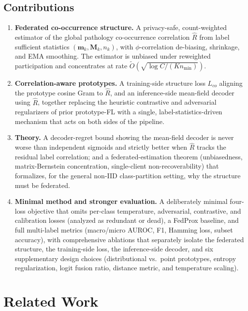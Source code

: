 \documentclass[11pt,a4paper]{article}
\theoremstyle{definition}
\newcommand{\Rhat}{\widehat{R}}
\begin{document}
\subsection{Contributions}

\begin{enumerate}[leftmargin=*,itemsep=2pt]
  \item \textbf{Federated co-occurrence structure.} A privacy-safe, count-weighted estimator of the global pathology co-occurrence correlation $\Rhat$ from label sufficient statistics $(\mathbf{m}_k,\mathbf{M}_k,n_k)$, with $\phi$-correlation de-biasing, shrinkage, and EMA smoothing. The estimator is unbiased under reweighted participation and concentrates at rate \allowbreak$\tilde O(\sqrt{\log C/(K n_{\min})})$.
  \item \textbf{Correlation-aware prototypes.} A training-side structure loss $L_{co}$ aligning the prototype cosine Gram to $\Rhat$, and an inference-side mean-field decoder using $\Rhat$, together replacing the heuristic contrastive and adversarial regularizers of prior prototype-FL with a single, label-statistics-driven mechanism that acts on both sides of the pipeline.
  \item \textbf{Theory.} A decoder-regret bound showing the mean-field decoder is never worse than independent sigmoids and strictly better when $\Rhat$ tracks the residual label correlation; and a federated-estimation theorem (unbiasedness, matrix-Bernstein concentration, single-client non-recoverability) that formalizes, for the general non-IID class-partition setting, why the structure must be federated.
  \item \textbf{Minimal method and stronger evaluation.} A deliberately minimal four-loss objective that omits per-class temperature, adversarial, contrastive, and calibration losses (analyzed as redundant or dead), a FedProx baseline, and full multi-label metrics (macro/micro AUROC, F1, Hamming loss, subset accuracy), with comprehensive ablations that separately isolate the federated structure, the training-side loss, the inference-side decoder, and six supplementary design choices (distributional vs.\ point prototypes, entropy regularization, logit fusion ratio, distance metric, and temperature scaling).
\end{enumerate}

\section{Related Work}
\label{sec:related}
\end{document}
